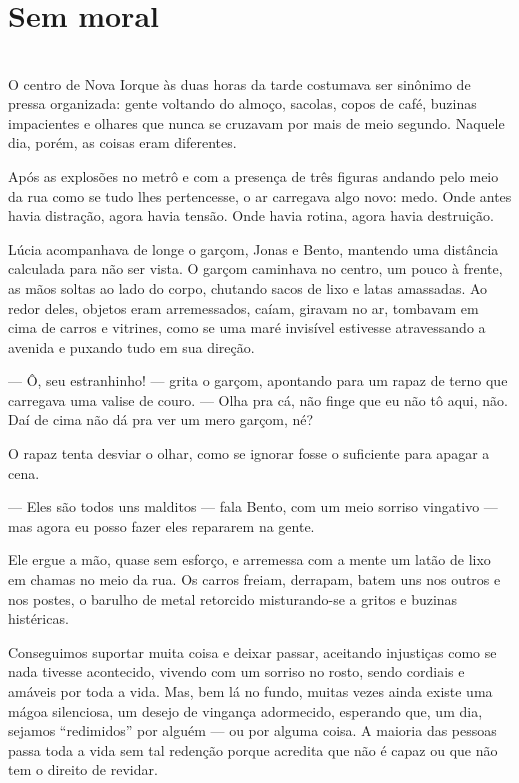 \newpage
\ifdefined\useChapters
\chapter{Sem moral}
\else
\chapter{}
\fi

O centro de Nova Iorque às duas horas da tarde costumava ser sinônimo de pressa organizada: gente voltando do almoço, sacolas, copos de café, buzinas impacientes e olhares que nunca se cruzavam por mais de meio segundo.  
Naquele dia, porém, as coisas eram diferentes.

Após as explosões no metrô e com a presença de três figuras andando pelo meio da rua como se tudo lhes pertencesse, o ar carregava algo novo: medo.  
Onde antes havia distração, agora havia tensão.  
Onde havia rotina, agora havia destruição.

Lúcia acompanhava de longe o garçom, Jonas e Bento, mantendo uma distância calculada para não ser vista.  
O garçom caminhava no centro, um pouco à frente, as mãos soltas ao lado do corpo, chutando sacos de lixo e latas amassadas.  
Ao redor deles, objetos eram arremessados, caíam, giravam no ar, tombavam em cima de carros e vitrines, como se uma maré invisível estivesse atravessando a avenida e puxando tudo em sua direção.

— Ô, seu estranhinho! — grita o garçom, apontando para um rapaz de terno que carregava uma valise de couro. — Olha pra cá, não finge que eu não tô aqui, não. Daí de cima não dá pra ver um mero garçom, né?

O rapaz tenta desviar o olhar, como se ignorar fosse o suficiente para apagar a cena.

— Eles são todos uns malditos — fala Bento, com um meio sorriso vingativo — mas agora eu posso fazer eles repararem na gente.

Ele ergue a mão, quase sem esforço, e arremessa com a mente um latão de lixo em chamas no meio da rua.  
Os carros freiam, derrapam, batem uns nos outros e nos postes, o barulho de metal retorcido misturando-se a gritos e buzinas histéricas.

Conseguimos suportar muita coisa e deixar passar, aceitando injustiças como se nada tivesse acontecido, vivendo com um sorriso no rosto, sendo cordiais e amáveis por toda a vida.  
Mas, bem lá no fundo, muitas vezes ainda existe uma mágoa silenciosa, um desejo de vingança adormecido, esperando que, um dia, sejamos “redimidos” por alguém — ou por alguma coisa.  
A maioria das pessoas passa toda a vida sem tal redenção porque acredita que não é capaz ou que não tem o direito de revidar.

